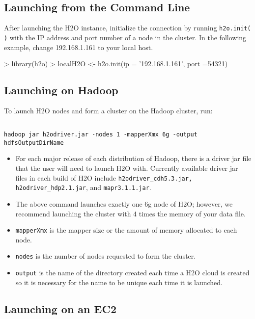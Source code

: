 \documentclass{article}[11pt]
\begin{document}
\subsection{Launching from the Command Line}

After launching the H2O instance, initialize the connection by running {\texttt{h2o.init( )}} with the IP address and port number of a node in the cluster. In the following example, change 192.168.1.161 to your local host. 
\begin{spverbatim}
> library(h2o)
> localH2O <- h2o.init(ip = '192.168.1.161', port =54321)
\end{spverbatim}

\subsection{Launching on Hadoop}

To launch H2O nodes and form a cluster on the Hadoop cluster, run:

\begin{lstlisting}[breaklines,basicstyle=\ttfamily]

hadoop jar h2odriver.jar -nodes 1 -mapperXmx 6g -output hdfsOutputDirName

\end{lstlisting}

\begin{itemize}
\item For each major release of each distribution of Hadoop, there is a driver jar file that the user will need to launch H2O with. Currently available driver jar files in each build of H2O include {\texttt{h2odriver\_cdh5.3.jar, h2odriver\_hdp2.1.jar}}, and {\texttt{mapr3.1.1.jar}}.
\item The above command launches exactly one 6g node of H2O; however,  we recommend launching the cluster with 4 times the memory of your data file.
\item{\texttt{mapperXmx}} is the mapper size or the amount of memory allocated to each node.
\item{\texttt{nodes}} is the number of nodes requested to form the cluster.
\item{\texttt{output}} is the name of the directory created each time a H2O cloud is created so it is necessary for the name to be unique each time it is launched.
\end{itemize}


\subsection{Launching on an EC2}
\end{document}
